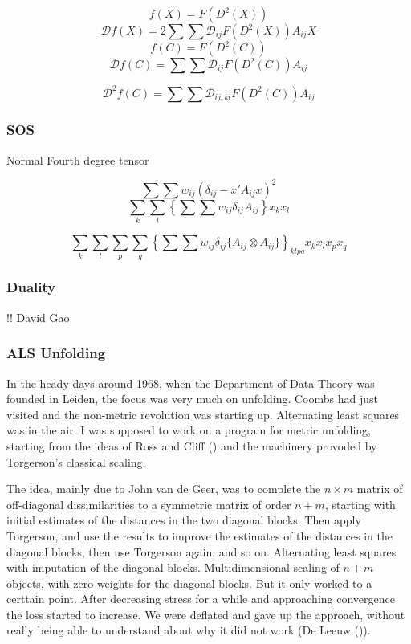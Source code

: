 \documentclass[
  12pt,
  letterpaper,
  DIV=11,
  numbers=noendperiod]{scrreprt}
\theoremstyle{remark}
\begin{document}
\[
f(X)=F(D^2(X))
\] \[
\mathcal{D}f(X)=2\sum\sum\mathcal{D}_{ij}F(D^2(X))A_{ij}X
\] \[
f(C)=F(D^2(C))
\] \[
\mathcal{D}f(C)=\sum\sum\mathcal{D}_{ij}F(D^2(C))A_{ij}
\]

\[
\mathcal{D}^2f(C)=\sum\sum\mathcal{D}_{ij,kl}F(D^2(C))A_{ij}
\]

\subsubsection{SOS}\label{sos}

Normal Fourth degree tensor

\[
\sum\sum w_{ij}(\delta_{ij}-x'A_{ij}x)^2
\] \[
\sum_k\sum_l\left\{\sum\sum w_{ij}\delta_{ij}A_{ij}\right\}x_kx_l
\]

\[
\sum_{k}\sum_l\sum_{p}\sum_q\left\{\sum\sum w_{ij}\delta_{ij}\{A_{ij}\otimes A_{ij}\}\right\}_{klpq}x_kx_lx_px_q
\]

\subsubsection{Duality}\label{duality}

!! David Gao

\subsubsection{ALS Unfolding}\label{alsunfold}

In the heady days around 1968, when the Department of Data Theory was
founded in Leiden, the focus was very much on unfolding. Coombs had just
visited and the non-metric revolution was starting up. Alternating least
squares was in the air. I was supposed to work on a program for metric
unfolding, starting from the ideas of Ross and Cliff
() and the machinery provoded by
Torgerson's classical scaling.

The idea, mainly due to John van de Geer, was to complete the
\(n\times m\) matrix of off-diagonal dissimilarities to a symmetric
matrix of order \(n+m\), starting with initial estimates of the
distances in the two diagonal blocks. Then apply Torgerson, and use the
results to improve the estimates of the distances in the diagonal
blocks, then use Torgerson again, and so on. Alternating least squares
with imputation of the diagonal blocks. Multidimensional scaling of
\(n+m\) objects, with zero weights for the diagonal blocks. But it only
worked to a certtain point. After decreasing stress for a while and
approaching convergence the loss started to increase. We were deflated
and gave up the approach, without really being able to understand about
why it did not work (De Leeuw ()).
\end{document}

